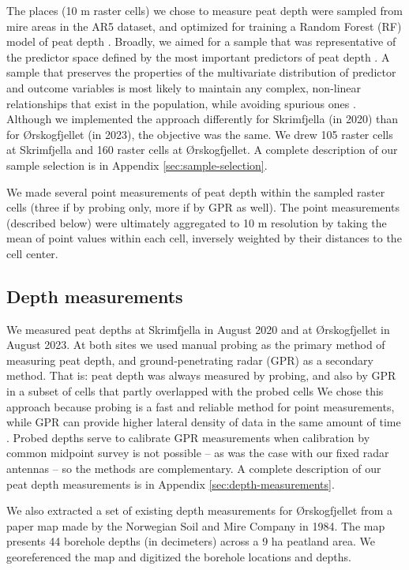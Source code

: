 \documentclass[soil, manuscript]{copernicus}
\begin{document}
The places (10 m raster cells) we chose to measure peat depth were sampled from mire areas in the AR5 dataset, and optimized for training a Random Forest (RF) model of peat depth \citep{brusSamplingDigitalSoil2019}.
Broadly, we aimed for a sample that was representative of the predictor space defined by the most important predictors of peat depth \citep{wadouxSamplingDesignOptimization2019, maComparisonConditionedLatin2020}.
A sample that preserves the properties of the multivariate distribution of predictor and outcome variables is most likely to maintain any complex, non-linear relationships that exist in the population, while avoiding spurious ones \citep{brusSamplingDigitalSoil2019}.
Although we implemented the approach differently for Skrimfjella (in 2020) than for Ørskogfjellet (in 2023), the objective was the same.
We drew 105 raster cells at Skrimfjella and 160 raster cells at Ørskogfjellet.
A complete description of our sample selection is in Appendix \ref{sec:sample-selection}.

We made several point measurements of peat depth within the sampled raster cells (three if by probing only, more if by GPR as well).
The point measurements (described below) were ultimately aggregated to 10 m resolution by taking the mean of point values within each cell, inversely weighted by their distances to the cell center.

\subsection{Depth measurements}

We measured peat depths at Skrimfjella in August 2020 and at Ørskogfjellet in August 2023.
At both sites we used manual probing as the primary method of measuring peat depth, and ground-penetrating radar (GPR) as a secondary method.
That is: peat depth was always measured by probing, and also by GPR in a subset of cells that partly overlapped with the probed cells
We chose this approach because probing is a fast and reliable method for point measurements, while GPR can provide higher lateral density of data in the same amount of time \citep{parryEvaluatingApproachesEstimating2014}.
Probed depths serve to calibrate GPR measurements when calibration by common midpoint survey is not possible -- as was the case with our fixed radar antennas -- so the methods are complementary.
A complete description of our peat depth measurements is in Appendix \ref{sec:depth-measurements}.

We also extracted a set of existing depth measurements for Ørskogfjellet from a paper map made by the Norwegian Soil and Mire Company in 1984.
The map presents 44 borehole depths (in decimeters) across a 9 ha peatland area.
We georeferenced the map and digitized the borehole locations and depths.
\end{document}
